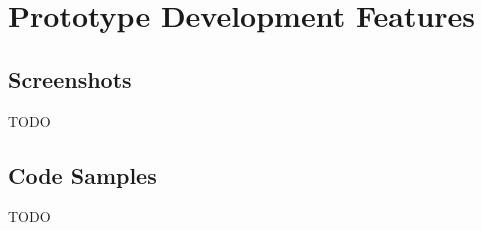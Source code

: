 \chapter{Prototype Development Features}
\label{app:prototype_development}

\section{Screenshots}
\label{app:screenshots}

TODO

\section{Code Samples}
\label{app:code_samples}

TODO